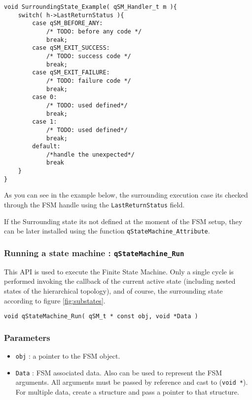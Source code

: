 \begin{lstlisting}[style=CStyle]
void SurroundingState_Example( qSM_Handler_t m ){
    switch( h->LastReturnStatus ){
        case qSM_BEFORE_ANY:
            /* TODO: before any code */
            break;
        case qSM_EXIT_SUCCESS:
            /* TODO: success code */
            break;
        case qSM_EXIT_FAILURE:
            /* TODO: failure code */
            break;
        case 0: 
            /* TODO: used defined*/
            break;
        case 1:
            /* TODO: used defined*/
            break;
        default: 
            /*handle the unexpected*/
            break
    }
}
\end{lstlisting}  

As you can see in the example below, the surrounding execution case its checked through the FSM handle using the \lstinline{LastReturnStatus} field.

If the Surrounding state its not defined at the moment of the FSM setup, they can be later installed using the function  \lstinline{qStateMachine_Attribute}.
\medskip


\subsubsection{Running a state machine : \texorpdfstring{\lstinline{qStateMachine_Run}}{qStateMachine_Run} }
This API  is used to execute the Finite State Machine. Only a single cycle is performed invoking the callback of the current active state (including nested states of the hierarchical topology), and of course, the surrounding state according to figure \ref{fig:substates}. 
\medskip

\begin{lstlisting}[style=CStyle]
void qStateMachine_Run( qSM_t * const obj, void *Data )
\end{lstlisting}

\subsubsection*{Parameters}
\begin{itemize}
    \item \lstinline{obj} : a pointer to the FSM object.
    \item \lstinline{Data} : FSM associated data. Also can be used to represent the FSM arguments. All arguments must be passed by reference and cast to (\lstinline{void *}). For multiple data, create a structure and pass a pointer to that structure.  
\end{itemize}  

